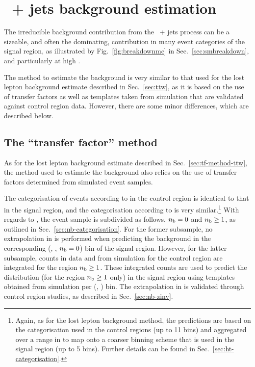 
\section{\texorpdfstring{\znunu\ + jets}{Zinv} background estimation}
\label{sec:zinv}

The irreducible background contribution from the \znunu\ + jets
process can be a sizeable, and often the dominating, contribution in
many event categories of the signal region, as illustrated by
Fig.~\ref{fig:breakdownmc} in Sec.~\ref{sec:smbreakdown}, and
particularly at high \HTmiss.

The method to estimate the \znunuj background is very similar to that
used for the lost lepton background estimate described in
Sec.~\ref{sec:ttw}, as it is based on the use of transfer factors as
well as templates taken from simulation that are validated against
control region data. However, there are some minor differences, which
are described below. 


\subsection{The ``transfer factor'' method}
\label{sec:tf-method-zinv}

As for the lost lepton background estimate described in
Sec.~\ref{sec:tf-method-ttw}, the method used to estimate the \znunuj
background also relies on the use of transfer factors determined from
simulated event samples. 

The categorisation of events according to \njet in the \mmj control
region is identical to that in the signal region, and the
categorisation according to \scalht is very similar.\footnote{Again,
  as for the lost lepton background method, the predictions are based
  on the \scalht categorisation used in the control regions (up to 11
  bins) and aggregated over a range in \scalht to map onto a coarser
  binning scheme that is used in the signal region (up to 5
  bins). Further details can be found in
  Sec.~\ref{sec:ht-categorisation}.} With regards to \nb, the \mmj
event sample is subdivided as follows, $n_{\text{b}} = 0$ and $n_{\text{b}} \geq 1$, as
outlined in Sec.~\ref{sec:nb-categorisation}. For the former
subsample, no extrapolation in \nb is performed when predicting the
\znunuj background in the corresponding (\njet, \scalht, $n_{\text{b}} = 0$)
bin of the signal region. However, for the latter subsample, counts in
data and from simulation for the \mmj control region are integrated
for the region $n_{\text{b}} \geq 1$. These integrated counts are used to
predict the \nb distribution (for the region $n_{\text{b}} \geq 1$ only) in the
signal region using \nb templates obtained from simulation per (\njet,
\scalht) bin. The extrapolation in \nb is validated through control
region studies, as described in Sec.~\ref{sec:nb-zinv}.

